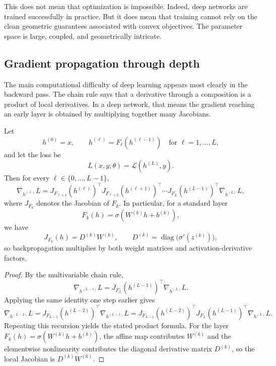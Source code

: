 \medskip

This does not mean that optimization is impossible.
Indeed, deep networks are trained successfully in practice.
But it does mean that training cannot rely on the clean geometric guarantees associated with convex objectives.
The parameter space is large, coupled, and geometrically intricate.


\subsection*{Gradient propagation through depth}

The main computational difficulty of deep learning appears most clearly in the backward pass.
The chain rule says that a derivative through a composition is a product of local derivatives.
In a deep network, that means the gradient reaching an early layer is obtained by multiplying together many Jacobians.

\begin{proposition}
Let
\[
h^{(0)}=x,
\qquad
h^{(\ell)}=F_{\ell}(h^{(\ell-1)})
\quad \text{for } \ell=1,\dots,L,
\]
and let the loss be
\[
L(x,y;\theta)=\mathcal L(h^{(L)},y).
\]
Then for every \(\ell\in\{0,\dots,L-1\}\),
\[
\nabla_{h^{(\ell)}} L
=
J_{F_{\ell+1}}(h^{(\ell)})^{\top}
J_{F_{\ell+2}}(h^{(\ell+1)})^{\top}
\cdots
J_{F_L}(h^{(L-1)})^{\top}
\nabla_{h^{(L)}}L,
\]
where \(J_{F_k}\) denotes the Jacobian of \(F_k\).
In particular, for a standard layer
\[
F_k(h)=\sigma(W^{(k)}h+b^{(k)}),
\]
we have
\[
J_{F_k}(h)=D^{(k)}W^{(k)},
\qquad
D^{(k)}=\operatorname{diag}\!\big(\sigma'(z^{(k)})\big),
\]
so backpropagation multiplies by both weight matrices and activation-derivative factors.
\end{proposition}

\begin{proof}
By the multivariable chain rule,
\[
\nabla_{h^{(L-1)}}L
=
J_{F_L}(h^{(L-1)})^{\top}\nabla_{h^{(L)}}L.
\]
Applying the same identity one step earlier gives
\[
\nabla_{h^{(L-2)}}L
=
J_{F_{L-1}}(h^{(L-2)})^{\top}\nabla_{h^{(L-1)}}L
=
J_{F_{L-1}}(h^{(L-2)})^{\top}J_{F_L}(h^{(L-1)})^{\top}\nabla_{h^{(L)}}L.
\]
Repeating this recursion yields the stated product formula.
For the layer \(F_k(h)=\sigma(W^{(k)}h+b^{(k)})\), the affine map contributes \(W^{(k)}\) and the elementwise nonlinearity contributes the diagonal derivative matrix \(D^{(k)}\), so the local Jacobian is \(D^{(k)}W^{(k)}\).
\end{proof}

